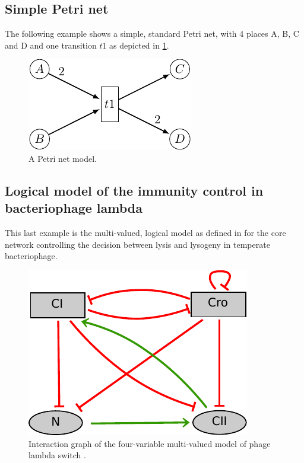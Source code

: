 \bigskip




\bigskip
\subsection{Simple Petri net} %
\label{sub:ex_pn}
The following example shows a simple, standard Petri net, with 4 places A, B, C and D and one transition $t1$ as depicted in \ref{ex-pn}.
\begin{figure}[hb]
  \includegraphics{figs/PN.pdf}
  \caption{A Petri net model.}
  \label{ex-pn}
\end{figure}





\bigskip
\subsection{Logical model of the immunity control in bacteriophage lambda}
\label{sub:ex_phage}
This last example is the multi-valued, logical model as defined in \cite{thieffry95} for the core network controlling the decision between lysis and lysogeny in temperate bacteriophage. 

\begin{figure}[hb]
  \includegraphics{figs/phage_lambda.pdf}
  \caption{Interaction graph of the four-variable multi-valued model of phage lambda switch \cite{thieffry95}.}
  \label{ex-phage}
\end{figure}







